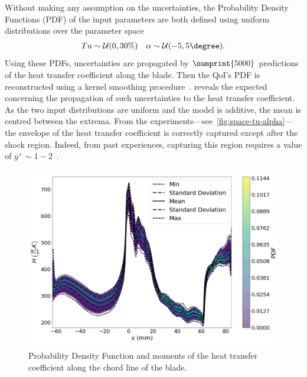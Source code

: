 Without making any assumption on the uncertainties, the Probability Density Functions (PDF) of the input parameters are both defined using uniform distributions over the parameter space
\begin{align}
Tu\sim \mathcal{U}(0,30\%) \quad \alpha \sim \mathcal{U}(-5,5\degree).
\end{align}
Using these PDFs, uncertainties are propagated by $\numprint{5000}$ predictions of the heat transfer coefficient along the blade. Then the QoI's PDF is reconstructed using a kernel smoothing procedure~\cite{Wand1995,Hastie2009}.  reveals the expected concerning the propagation of such uncertainties to the heat transfer coefficient. As the two input distributions are uniform and the model is additive, the mean is centred between the extrema. From the experiments---see~\cref{fig:space-tu-alpha}---the envelope of the heat transfer coefficient is correctly captured except after the shock region. Indeed, from past experiences, capturing this region requires a value of $y^+\sim 1-2$~\cite{Segui2017b}.

\begin{figure}[!ht]
\centering
\includegraphics[width=\linewidth]{fig/applications/ls89/13_2column_color-online-only_pdf-moments.pdf}
\caption{Probability Density Function and moments of the heat transfer coefficient along the chord line of the blade.}
\label{fig:ls89-propagation}
\end{figure}

